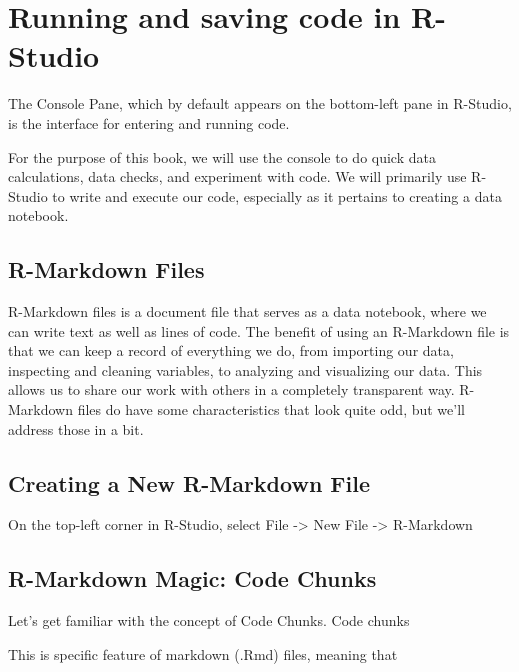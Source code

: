 \documentclass[
]{book}
\begin{document}
\hypertarget{running-and-saving-code-in-r-studio}{%
\section{Running and saving code in R-Studio}\label{running-and-saving-code-in-r-studio}}

The Console Pane, which by default appears on the bottom-left pane in R-Studio, is the interface for entering and running code.

For the purpose of this book, we will use the console to do quick data calculations, data checks, and experiment with code. We will primarily use R-Studio to write and execute our code, especially as it pertains to creating a data notebook.

\hypertarget{r-markdown-files}{%
\subsection{R-Markdown Files}\label{r-markdown-files}}

R-Markdown files is a document file that serves as a data notebook, where we can write text as well as lines of code. The benefit of using an R-Markdown file is that we can keep a record of everything we do, from importing our data, inspecting and cleaning variables, to analyzing and visualizing our data. This allows us to share our work with others in a completely transparent way. R-Markdown files do have some characteristics that look quite odd, but we'll address those in a bit.

\hypertarget{creating-a-new-r-markdown-file}{%
\subsection{Creating a New R-Markdown File}\label{creating-a-new-r-markdown-file}}

On the top-left corner in R-Studio, select File -\textgreater{} New File -\textgreater{} R-Markdown

\hypertarget{r-markdown-magic-code-chunks}{%
\subsection{R-Markdown Magic: Code Chunks}\label{r-markdown-magic-code-chunks}}

Let's get familiar with the concept of Code Chunks. Code chunks

This is specific feature of markdown (.Rmd) files, meaning that
\end{document}
